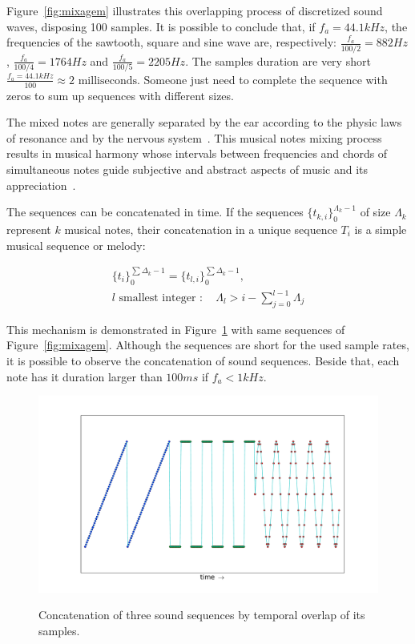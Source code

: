 \documentclass[
 aip,
 jmp,
 amsmath,amssymb,
 reprint,
]{revtex4-1}
\begin{document}
Figure~\ref{fig:mixagem} illustrates this overlapping process of discretized sound waves, disposing 100 samples. It is possible to conclude that, if $f_a=44.1kHz$, the frequencies of the sawtooth, square and sine wave are, respectively: $\frac{f_a}{100/2}=882Hz$, $\frac{f_a}{100/4}=1764Hz$ and $\frac{f_a}{100/5}=2205Hz$. The samples duration are very short $\frac{f_a=44.1kHz}{100} \approx 2 \text{ milliseconds}$. Someone just need to complete the sequence with zeros to sum up sequences with different sizes.

The mixed notes are generally separated by the ear according to the physic laws of resonance and by the nervous system~\cite{Roederer}.  This musical notes mixing process results in musical harmony whose intervals between frequencies and chords of simultaneous notes guide subjective and abstract aspects of music and its appreciation~\cite{Harmonia}. 

The sequences can be concatenated in time. If the sequences $\{t_{k,i}\}_0^{\Lambda_k-1}$ of size $\Lambda_k$ represent $k$ musical notes, their concatenation in a unique sequence $T_i$ is a simple musical sequence or melody:

\begin{multline}\label{eq:concatenacao}
\{t_i\}_0^{\sum\Delta_k-1}=\{t_{l,i}\}_0^{\sum\Delta_k-1}, \;\; \\ l\text{ smallest integer } : \quad \Lambda_l > i -\sum_{j=0}^{l-1}\Lambda_j
\end{multline}

This mechanism is demonstrated in Figure~\ref{fig:concatenacao} with same sequences of Figure~\ref{fig:mixagem}. Although the sequences are short for the used sample rates, it is possible to observe the concatenation of sound sequences. Beside that, each note has it duration larger than $100ms$ if $f_a<1kHz$.

\begin{figure}[h!]
{    \centering
        \includegraphics[width=\columnwidth]{figures/concatenacao}}
    \caption{Concatenation of three sound sequences by temporal overlap of its samples.}
        \label{fig:concatenacao}
\end{figure}
\end{document}
